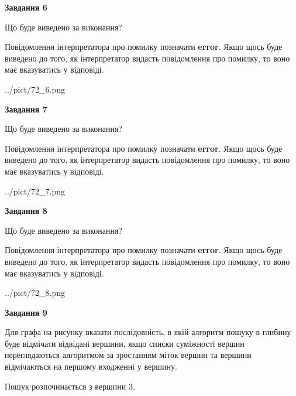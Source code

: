 \documentclass[12pt, ukrainian]{article}
\begin{document}
{\begin {large}
{\begin {center}\textbf{Завдання 6}\end {center}}\par
Що буде виведено за виконання?

Повідомлення інтерпретатора про помилку позначати \textbf{error}.
Якщо щось буде виведено до того, як інтерпретатор видасть повідомлення про помилку, 
то воно має вказуватись у відповіді. \par


\begin{center}
	{../pict/72_6.png}
\end{center}
\newpage

{\begin {center}\textbf{Завдання 7}\end {center}}\par
Що буде виведено за виконання?

Повідомлення інтерпретатора про помилку позначати \textbf{error}.
Якщо щось буде виведено до того, як інтерпретатор видасть повідомлення про помилку, 
то воно має вказуватись у відповіді. \par


\begin{center}
	{../pict/72_7.png}
\end{center}
\newpage

{\begin {center}\textbf{Завдання 8}\end {center}}\par
Що буде виведено за виконання?

Повідомлення інтерпретатора про помилку позначати \textbf{error}.
Якщо щось буде виведено до того, як інтерпретатор видасть повідомлення про помилку, 
то воно має вказуватись у відповіді. \par


\begin{center}
	{../pict/72_8.png}
\end{center}
\newpage

{\begin {center}\textbf{Завдання 9}\end {center}}\par
Для графа на рисунку вказати послідовність, в якій алгоритм пошуку в глибину буде відмічати відвідані вершини, якщо списки суміжності вершин переглядаються алгоритмом за зростанням міток вершин та вершини відмічаються на першому вход\-женні у вершину.\par
Пошук розпочинається з вершини 3.\par


\end{large}}
\end{document}
